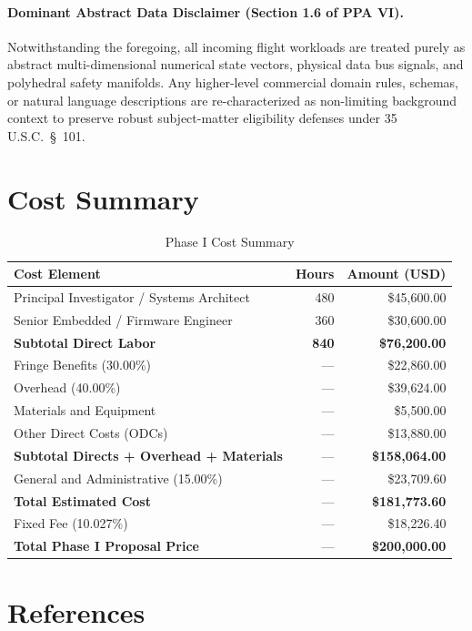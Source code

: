 \documentclass[11pt,oneside]{article}
\begin{document}
\paragraph{Dominant Abstract Data Disclaimer (Section 1.6 of PPA VI).} Notwithstanding the foregoing, all incoming flight workloads are treated purely as abstract multi-dimensional numerical state vectors, physical data bus signals, and polyhedral safety manifolds. Any higher-level commercial domain rules, schemas, or natural language descriptions are re-characterized as non-limiting background context to preserve robust subject-matter eligibility defenses under 35 U.S.C.~\S~101.

\section{Cost Summary}

\begin{table}[htbp]
\centering
\caption{Phase I Cost Summary}
\label{tab:cost}
\begin{tabular}{@{}lrr@{}}
\toprule
\textbf{Cost Element} & \textbf{Hours} & \textbf{Amount (USD)} \\
\midrule
Principal Investigator / Systems Architect & 480 & \$45,600.00 \\
Senior Embedded / Firmware Engineer & 360 & \$30,600.00 \\
\midrule
\textbf{Subtotal Direct Labor} & \textbf{840} & \textbf{\$76,200.00} \\
Fringe Benefits (30.00\%) & --- & \$22,860.00 \\
Overhead (40.00\%) & --- & \$39,624.00 \\
Materials and Equipment & --- & \$5,500.00 \\
Other Direct Costs (ODCs) & --- & \$13,880.00 \\
\midrule
\textbf{Subtotal Directs + Overhead + Materials} & --- & \textbf{\$158,064.00} \\
General and Administrative (15.00\%) & --- & \$23,709.60 \\
\midrule
\textbf{Total Estimated Cost} & --- & \textbf{\$181,773.60} \\
Fixed Fee (10.027\%) & --- & \$18,226.40 \\
\midrule
\textbf{Total Phase I Proposal Price} & --- & \textbf{\$200,000.00} \\
\bottomrule
\end{tabular}
\end{table}

\section{References}
\end{document}
